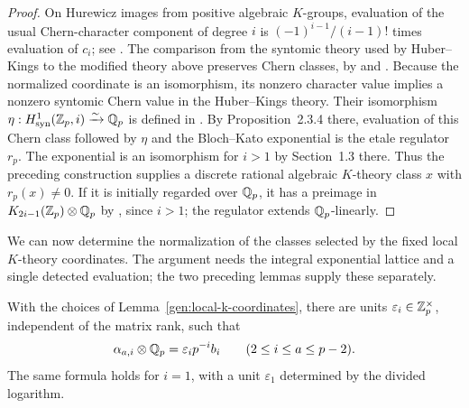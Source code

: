 \begin{proof}
On Hurewicz images from positive algebraic $K$-groups, evaluation of
the usual Chern-character component of degree $i$ is
$(-1)^{i-1}/(i-1)!$ times evaluation of $c_i$; see
\cite[the remark after Definition~4.23 and Section~5.9]{TammeRelativeChern}.
The comparison from the syntomic theory used by Huber--Kings to the
modified theory above preserves Chern classes, by
\cite[Section~4]{BesserDeJeu} and
\cite[Propositions~2.2.7 and~2.2.9]{HuberKings}.  Because the normalized coordinate
is an isomorphism, its nonzero character value implies a nonzero
syntomic Chern value in the Huber--Kings theory.  Their isomorphism
$\eta:H^1_{\mathrm{syn}}(\mathbb Z_p,i)\xrightarrow{\sim}\mathbb Q_p$ is defined in
\cite[Definition~2.2.5]{HuberKings}.  By Proposition~2.3.4 there,
evaluation of this Chern class followed by $\eta$ and the Bloch--Kato
exponential is the etale regulator $r_p$.  The exponential is an
isomorphism for $i>1$ by Section~1.3 there.  Thus the
preceding construction supplies a discrete rational algebraic
$K$-theory class $x$ with $r_p(x)\ne0$.  If it is initially regarded
over $\mathbb Q_p$, it has a preimage in $K_{2i-1}(\mathbb Z_p)\otimes\mathbb Q_p$ by
\cite[Remark~1.3.1]{HuberKings}, since $i>1$; the regulator extends $\mathbb Q_p$-linearly.
\end{proof}

We can now determine the normalization of the classes selected by
the fixed local $K$-theory coordinates.  The argument needs the
integral exponential lattice and a single detected evaluation; the
two preceding lemmas supply these separately.

\begin{lemma}
\label{lem:regulator-lattice}
With the choices of Lemma~\ref{gen:local-k-coordinates}, there are
units $\varepsilon_i\in\mathbb Z_p^\times$, independent of the matrix rank,
such that
\begin{equation}\label{gen:primitive-normalization}
 \alpha_{a,i}\otimes\mathbb Q_p=\varepsilon_i p^{-i}b_i
 \qquad (2\leq i\leq a\leq p-2).
\end{equation}
The same formula holds for $i=1$, with a unit
$\varepsilon_1$ determined by the divided logarithm.
\end{lemma}

